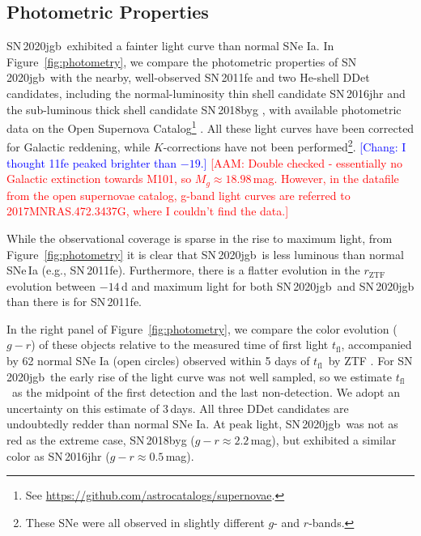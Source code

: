 \documentclass[twocolumn]{aastex631}
\newcommand{\sn}{SN\,2020jgb}
\newcommand{\tfl}{$t_\mathrm{fl}$}
\newcommand{\adam}[1]{\textcolor{red}{[AAM: #1]}}
\newcommand{\chang}[1]{\textcolor{blue}{[Chang: #1]}}
\begin{document}
\subsection{Photometric Properties}
\sn\ exhibited a fainter light curve than normal SNe Ia. In Figure~\ref{fig:photometry}, we compare the photometric properties of \sn\ with the nearby, well-observed SN\,2011fe \citep{Nugent_11fe_2011} and two He-shell DDet candidates, including the normal-luminosity thin shell candidate SN\,2016jhr \citep{jiang_16jhr_2017} and the sub-luminous thick shell candidate SN\,2018byg \citep{de_18byg_2019}, with available photometric data on the Open Supernova Catalog\footnote{See \url{https://github.com/astrocatalogs/supernovae}.} \citep{Guillochon_2017}. All these light curves have been corrected for Galactic reddening, while $K$-corrections have not been performed\footnote{These SNe were all observed in slightly different $g$- and $r$-bands.}. \chang{I thought 11fe peaked brighter than $-19$.} \adam{Double checked - essentially no Galactic extinction towards M101, so $M_g\approx18.98$\,mag. However, in the datafile from the open supernovae catalog, g-band light curves are referred to 2017MNRAS.472.3437G, where I couldn't find the data.}

While the observational coverage is sparse in the rise to maximum light, from Figure~\ref{fig:photometry} it is clear that \sn\ is less luminous than normal SNe\,Ia (e.g., SN\,2011fe). Furthermore, there is a flatter evolution in the $r_\mathrm{ZTF}$ evolution between $-14$\,d and maximum light for both \sn\ and SN\,2020jgb than there is for SN\,2011fe.  

In the right panel of Figure~\ref{fig:photometry}, we compare the color evolution ($g-r$) of these objects relative to the measured time of first light \tfl, accompanied by 62 normal SNe Ia (open circles) observed within 5 days of \tfl\ by ZTF \citep[from][]{Bulla2020}. For \sn\, the early rise of the light curve was not well sampled, so we estimate \tfl\ as the midpoint of the first detection and the last non-detection. We adopt an uncertainty on this estimate of 3\,days. 
All three DDet candidates are undoubtedly redder than normal SNe Ia. At peak light, \sn\ was not as red as the extreme case, SN\,2018byg ($g-r\approx2.2$\,mag), but exhibited a similar color as SN\,2016jhr ($g-r\approx0.5$\,mag).
\end{document}

